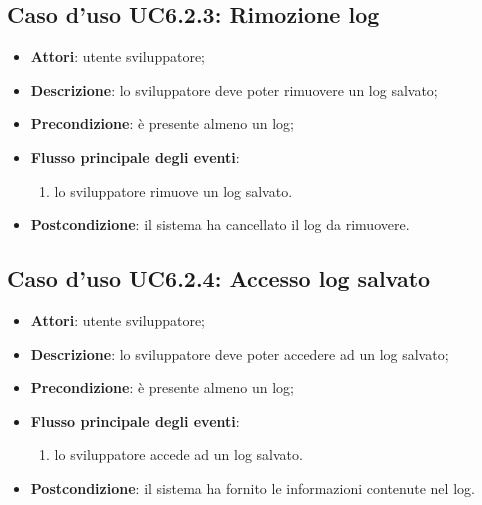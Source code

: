 \documentclass[../AnalisiDeiRequisiti.tex]{subfiles}
\begin{document}
\subsection{Caso d'uso UC6.2.3: Rimozione log}
\begin{itemize}
	\item \textbf{Attori}: utente sviluppatore;
	\item \textbf{Descrizione}: lo sviluppatore deve poter rimuovere un log salvato; 
	\item \textbf{Precondizione}: è presente almeno un log;
	
	\item \textbf{Flusso principale degli eventi}:
	\begin{enumerate}
		\item lo sviluppatore rimuove un log salvato.
		
	\end{enumerate}
	\item \textbf{Postcondizione}: il sistema ha cancellato il log da rimuovere.
\end{itemize}
\hypertarget{UC6.2.4}{}
\subsection{Caso d'uso UC6.2.4: Accesso log salvato}
\begin{itemize}
	\item \textbf{Attori}: utente sviluppatore;
	\item \textbf{Descrizione}: lo sviluppatore deve poter accedere ad un log salvato; 
	\item \textbf{Precondizione}: è presente almeno un log;
	
	\item \textbf{Flusso principale degli eventi}:
	\begin{enumerate}
		\item lo sviluppatore accede ad un log salvato.
		
	\end{enumerate}
	\item \textbf{Postcondizione}: il sistema ha fornito le informazioni contenute nel log.
\end{itemize}
\hypertarget{UC7}{}
\end{document}
